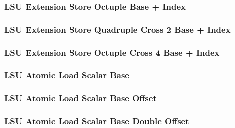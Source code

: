 

\subsubsection[{\small LSU Extension Store Octuple Base + Index}]{LSU Extension Store Octuple Base + Index} \label{sec:format-LSU-XSOBI}



\subsubsection[{\small LSU Extension Store Quadruple Cross 2 Base + Index}]{LSU Extension Store Quadruple Cross 2 Base + Index} \label{sec:format-LSU-XSOC2BI}



\subsubsection[{\small LSU Extension Store Octuple Cross 4 Base + Index}]{LSU Extension Store Octuple Cross 4 Base + Index} \label{sec:format-LSU-XSOC4BI}



\subsubsection[{\small LSU Atomic Load Scalar Base}]{LSU Atomic Load Scalar Base} \label{sec:format-LSU-ALSB}



\subsubsection[{\small LSU Atomic Load Scalar Base Offset}]{LSU Atomic Load Scalar Base Offset} \label{sec:format-LSU-ALSB.O}



\subsubsection[{\small LSU Atomic Load Scalar Base Double Offset}]{LSU Atomic Load Scalar Base Double Offset} \label{sec:format-LSU-ALSB.D}

